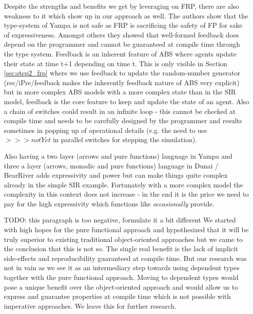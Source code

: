 Despite the strengths and benefits we get by leveraging on FRP, there are also weakness to it which show up in our approach as well. The authors \cite{sculthorpe_safe_2009} show that the type-system of Yampa is not safe as FRP is sacrificing the safety of FP for sake of expressiveness. Amongst others they showed that well-formed feedback does depend on the programmer and cannot be guaranteed at compile time through the type system. Feedback is an inherent feature of ABS where agents update their state at time t+1 depending on time t. This is only visible in Section \ref{sec:step2_frp} where we use feedback to update the random-number generator (rec/iPre/feedback makes the inherently feedback nature of ABS very explicit) but in more complex ABS models with a more complex state than in the SIR model, feedback is the core feature to keep and update the state of an agent. Also a chain of switches could result in an infinite loop - this cannot be checked at compile time and needs to be carefully designed by the programmer and results sometimes in popping up of operational details (e.g. the need to use $>>> notYet$ in parallel switches for stepping the simulation). 

Also having a two layer (arrows and pure functions) language in Yampa \cite{jeffrey_causality_2013} and three a layer (arrows, monadic and pure functions) language in Dunai / BearRiver adds expressivity and power but can make things quite complex already in the simple SIR example. Fortunately with a more complex model the complexity in this context does not increase - in the end it is the price we need to pay for the high expressivity which functions like \textit{occasionally} provide.

TODO: this paragraph is too negative, formulate it a bit different
We started with high hopes for the pure functional approach and hypothesized that it will be truly superior to existing traditional object-oriented approaches but we came to the conclusion that this is not so. The single real benefit is the lack of implicit side-effects and reproducibility guaranteed at compile time. But our research was not in vain as we see it as an intermediary step towards using dependent types together with the pure functional approach. Moving to dependent types would pose a unique benefit over the object-oriented approach and would allow us to express and guarantee properties at compile time which is not possible with imperative approaches. We leave this for further research.

